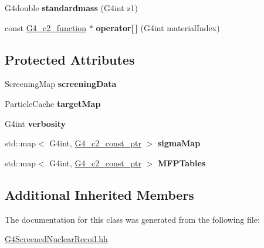 \begin{DoxyCompactItemize}
\item 
\hypertarget{classG4ScreenedCoulombCrossSection_a90cfe2fb3343c4ef563d558cf3df21f8}{G4double {\bfseries standardmass} (G4int z1)}\label{classG4ScreenedCoulombCrossSection_a90cfe2fb3343c4ef563d558cf3df21f8}

\item 
\hypertarget{classG4ScreenedCoulombCrossSection_a102e24c7581ba1249306290eff349225}{const \hyperlink{classc2__function}{G4\-\_\-c2\-\_\-function} $\ast$ {\bfseries operator\mbox{[}$\,$\mbox{]}} (G4int material\-Index)}\label{classG4ScreenedCoulombCrossSection_a102e24c7581ba1249306290eff349225}

\end{DoxyCompactItemize}
\subsection*{Protected Attributes}
\begin{DoxyCompactItemize}
\item 
\hypertarget{classG4ScreenedCoulombCrossSection_acee3c711dd831c718fc22d5c98334f56}{Screening\-Map {\bfseries screening\-Data}}\label{classG4ScreenedCoulombCrossSection_acee3c711dd831c718fc22d5c98334f56}

\item 
\hypertarget{classG4ScreenedCoulombCrossSection_a4f47a69e60be10d7040de1fbc9612887}{Particle\-Cache {\bfseries target\-Map}}\label{classG4ScreenedCoulombCrossSection_a4f47a69e60be10d7040de1fbc9612887}

\item 
\hypertarget{classG4ScreenedCoulombCrossSection_a9b29c3d5aa9807d66afee4e59905d7e3}{G4int {\bfseries verbosity}}\label{classG4ScreenedCoulombCrossSection_a9b29c3d5aa9807d66afee4e59905d7e3}

\item 
\hypertarget{classG4ScreenedCoulombCrossSection_ae6c847c6a7aac54186ab96ea4d44be3a}{std\-::map$<$ G4int, \hyperlink{classc2__const__ptr}{G4\-\_\-c2\-\_\-const\-\_\-ptr} $>$ {\bfseries sigma\-Map}}\label{classG4ScreenedCoulombCrossSection_ae6c847c6a7aac54186ab96ea4d44be3a}

\item 
\hypertarget{classG4ScreenedCoulombCrossSection_a4edd4f54a2c248eb398f06127962e550}{std\-::map$<$ G4int, \hyperlink{classc2__const__ptr}{G4\-\_\-c2\-\_\-const\-\_\-ptr} $>$ {\bfseries M\-F\-P\-Tables}}\label{classG4ScreenedCoulombCrossSection_a4edd4f54a2c248eb398f06127962e550}

\end{DoxyCompactItemize}
\subsection*{Additional Inherited Members}


The documentation for this class was generated from the following file\-:\begin{DoxyCompactItemize}
\item 
\hyperlink{G4ScreenedNuclearRecoil_8hh}{G4\-Screened\-Nuclear\-Recoil.\-hh}\end{DoxyCompactItemize}
